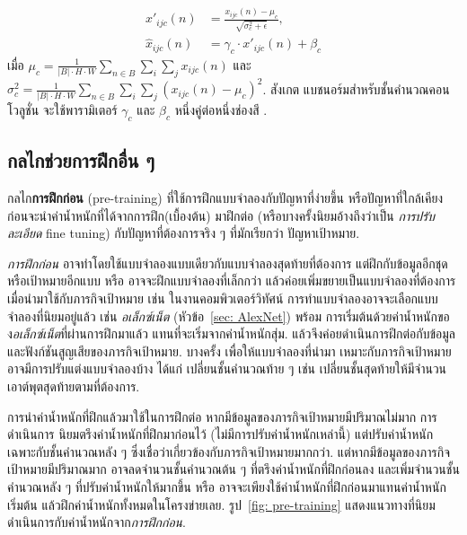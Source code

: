 \begin{align}
x'_{ijc}(n) &= \frac{x_{ijc}(n) - \mu_c}{ \sqrt{\sigma_c^2 + \epsilon}}
\label{eq: batch norm conv 1} , \\
\hat{x}_{ijc}(n) &= \gamma_c \cdot x'_{ijc}(n) + \beta_c
\label{eq: batch norm conv 2}
\end{align}
เมื่อ $\mu_c = \frac{1}{|B| \cdot H \cdot W} \sum_{n \in B} \sum_i \sum_j x_{ijc}(n)$
และ
$\sigma_c^2 = \frac{1}{|B| \cdot H \cdot W} \sum_{n \in B} \sum_i \sum_j (x_{ijc}(n) - \mu_c)^2$.
สังเกต แบชนอร์มสำหรับชั้นคำนวณคอนโวลูชั่น
จะใช้พารามิเตอร์ $\gamma_c$ และ $\beta_c$ หนึ่งคู่ต่อหนึ่งช่องสี%
.

\subsection{กลไกช่วยการฝึกอื่น ๆ}
\label{sec: deep adv train}

กลไก\textbf{การฝึกก่อน} (pre-training)
ที่ใช้การฝึกแบบจำลองกับปัญหาที่ง่ายขึ้น หรือปัญหาที่ใกล้เคียง ก่อนจะนำค่าน้ำหนักที่ได้จากการฝึก(เบื้องต้น)
มาฝึกต่อ (หรือบางครั้งนิยมอ้างถึงว่าเป็น \textit{การปรับละเอียด} fine tuning) กับปัญหาที่ต้องการจริง ๆ ที่มักเรียกว่า ปัญหาเป้าหมาย.

\textit{การฝึกก่อน} อาจทำโดยใช้แบบจำลองแบบเดียวกับแบบจำลองสุดท้ายที่ต้องการ
แต่ฝึกกับข้อมูลอีกชุด หรือเป้าหมายอีกแบบ
หรือ อาจจะฝึกแบบจำลองที่เล็กกว่า
แล้วค่อยเพิ่มขยายเป็นแบบจำลองที่ต้องการ เมื่อนำมาใช้กับภารกิจเป้าหมาย
เช่น ในงานคอมพิวเตอร์วิทัศน์
การทำแบบจำลองอาจจะเลือกแบบจำลองที่นิยมอยู่แล้ว
เช่น \textit{อเล็กซ์เน็ต} (หัวข้อ~\ref{sec: AlexNet})
พร้อม%
การเริ่มต้นด้วยค่าน้ำหนักของ\textit{อเล็กซ์เน็ต}ที่ผ่านการฝึกมาแล้ว
แทนที่จะเริ่มจากค่าน้ำหนักสุ่ม.
แล้วจึงค่อยดำเนินการฝึกต่อกับข้อมูลและฟังก์ชันสูญเสียของภารกิจเป้าหมาย.
บางครั้ง เพื่อให้แบบจำลองที่นำมา เหมาะกับภารกิจเป้าหมาย
อาจมีการปรับแต่งแบบจำลองบ้าง ได้แก่ เปลี่ยนชั้นคำนวณท้าย ๆ เช่น เปลี่ยนชั้นสุดท้ายให้มีจำนวนเอาต์พุตสุดท้ายตามที่ต้องการ.

การนำค่าน้ำหนักที่ฝึกแล้วมาใช้ในการฝึกต่อ
หากมีข้อมูลของภารกิจเป้าหมายมีปริมาณไม่มาก
การดำเนินการ นิยมตรึงค่าน้ำหนักที่ฝึกมาก่อนไว้ (ไม่มีการปรับค่าน้ำหนักเหล่านี้)
แต่ปรับค่าน้ำหนักเฉพาะกับชั้นคำนวณหลัง ๆ ซึ่งเชื่อว่าเกี่ยวข้องกับภารกิจเป้าหมายมากกว่า.
แต่หากมีข้อมูลของภารกิจเป้าหมายมีปริมาณมาก
อาจลดจำนวนชั้นคำนวณต้น ๆ ที่ตรึงค่าน้ำหนักที่ฝึกก่อนลง และเพิ่มจำนวนชั้นคำนวณหลัง ๆ ที่ปรับค่าน้ำหนักให้มากขึ้น
หรือ อาจจะเพียงใช้ค่าน้ำหนักที่ฝึกก่อนมาแทนค่าน้ำหนักเริ่มต้น แล้วฝึกค่าน้ำหนักทั้งหมดในโครงข่ายเลย.
รูป~\ref{fig: pre-training} แสดงแนวทางที่นิยมดำเนินการกับค่าน้ำหนักจาก\textit{การฝึกก่อน}.

